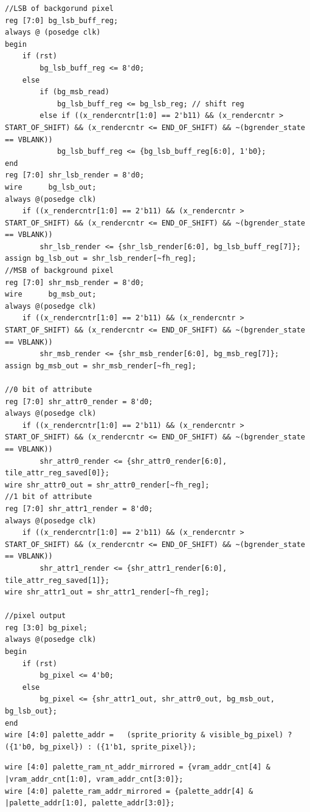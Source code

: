 \begin{lstlisting}[caption={Pixel adat feldolgozó SRL léptető regiszterek}, label={code:SRL-shiftregs}, style=prettyverilog]
//LSB of backgorund pixel
reg [7:0] bg_lsb_buff_reg;
always @ (posedge clk) 
begin
	if (rst)
		bg_lsb_buff_reg <= 8'd0;
	else
		if (bg_msb_read)
			bg_lsb_buff_reg <= bg_lsb_reg; // shift reg
		else if ((x_rendercntr[1:0] == 2'b11) && (x_rendercntr > START_OF_SHIFT) && (x_rendercntr <= END_OF_SHIFT) && ~(bgrender_state == VBLANK))
			bg_lsb_buff_reg <= {bg_lsb_buff_reg[6:0], 1'b0}; 
end
reg [7:0] shr_lsb_render = 8'd0;
wire	  bg_lsb_out;  
always @(posedge clk) 
	if ((x_rendercntr[1:0] == 2'b11) && (x_rendercntr > START_OF_SHIFT) && (x_rendercntr <= END_OF_SHIFT) && ~(bgrender_state == VBLANK))
		shr_lsb_render <= {shr_lsb_render[6:0], bg_lsb_buff_reg[7]};
assign bg_lsb_out = shr_lsb_render[~fh_reg];
//MSB of background pixel
reg [7:0] shr_msb_render = 8'd0;
wire	  bg_msb_out;  
always @(posedge clk) 
	if ((x_rendercntr[1:0] == 2'b11) && (x_rendercntr > START_OF_SHIFT) && (x_rendercntr <= END_OF_SHIFT) && ~(bgrender_state == VBLANK))
		shr_msb_render <= {shr_msb_render[6:0], bg_msb_reg[7]};
assign bg_msb_out = shr_msb_render[~fh_reg];

//0 bit of attribute
reg [7:0] shr_attr0_render = 8'd0; 
always @(posedge clk) 
	if ((x_rendercntr[1:0] == 2'b11) && (x_rendercntr > START_OF_SHIFT) && (x_rendercntr <= END_OF_SHIFT) && ~(bgrender_state == VBLANK))
		shr_attr0_render <= {shr_attr0_render[6:0], tile_attr_reg_saved[0]};
wire shr_attr0_out = shr_attr0_render[~fh_reg];
//1 bit of attribute
reg [7:0] shr_attr1_render = 8'd0; 
always @(posedge clk) 
	if ((x_rendercntr[1:0] == 2'b11) && (x_rendercntr > START_OF_SHIFT) && (x_rendercntr <= END_OF_SHIFT) && ~(bgrender_state == VBLANK))
		shr_attr1_render <= {shr_attr1_render[6:0], tile_attr_reg_saved[1]};
wire shr_attr1_out = shr_attr1_render[~fh_reg];

//pixel output
reg [3:0] bg_pixel;
always @(posedge clk) 
begin
	if (rst)
		bg_pixel <= 4'b0;
	else
		bg_pixel <= {shr_attr1_out, shr_attr0_out, bg_msb_out, bg_lsb_out};		
end
wire [4:0] palette_addr = 	(sprite_priority & visible_bg_pixel) ? ({1'b0, bg_pixel}) : ({1'b1, sprite_pixel});\end{lstlisting}

\begin{lstlisting}[caption={A paletta címek tükrözése}, label={code:palette-mirroring}, style=prettyverilog]
wire [4:0] palette_ram_nt_addr_mirrored = {vram_addr_cnt[4] & |vram_addr_cnt[1:0], vram_addr_cnt[3:0]};									
wire [4:0] palette_ram_addr_mirrored = {palette_addr[4] & |palette_addr[1:0], palette_addr[3:0]};\end{lstlisting}

